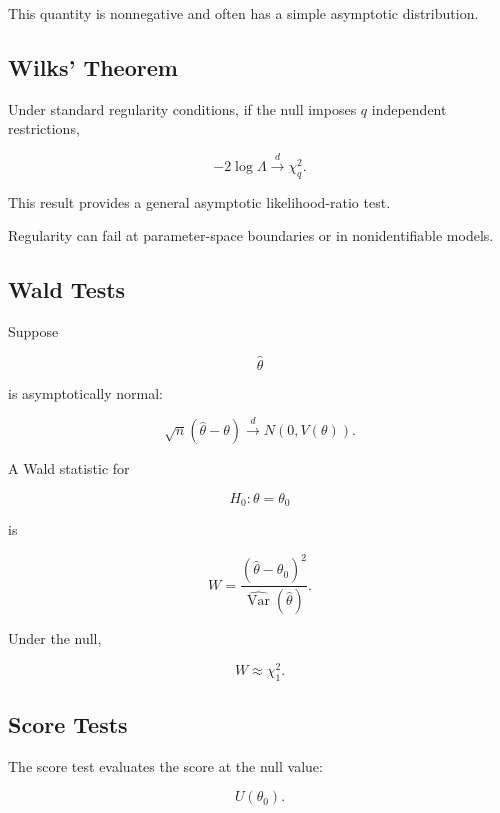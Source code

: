 This quantity is nonnegative and often has a simple asymptotic
distribution.

\subsection{Wilks' Theorem}
\label{subsec:wilks-theorem-mathstat}

Under standard regularity conditions, if the null imposes \(q\)
independent restrictions,

\[
\boxed{
-2\log\Lambda
\xrightarrow{d}
\chi^2_q.
}
\]

This result provides a general asymptotic likelihood-ratio test.

Regularity can fail at parameter-space boundaries or in nonidentifiable
models.

\subsection{Wald Tests}
\label{subsec:wald-tests-mathstat}

Suppose

\[
\widehat{\theta}
\]

is asymptotically normal:

\[
\sqrt{n}
(
\widehat{\theta}-\theta
)
\xrightarrow{d}
N(0,V(\theta)).
\]

A Wald statistic for

\[
H_0:\theta=\theta_0
\]

is

\[
\boxed{
W
=
\frac{
(
\widehat{\theta}-\theta_0
)^2
}{
\widehat{\operatorname{Var}}
(
\widehat{\theta}
)
}.
}
\]

Under the null,

\[
\boxed{
W
\approx
\chi^2_1.
}
\]

\subsection{Score Tests}
\label{subsec:score-tests-mathstat}

The score test evaluates the score at the null value:

\[
U(\theta_0).
\]

